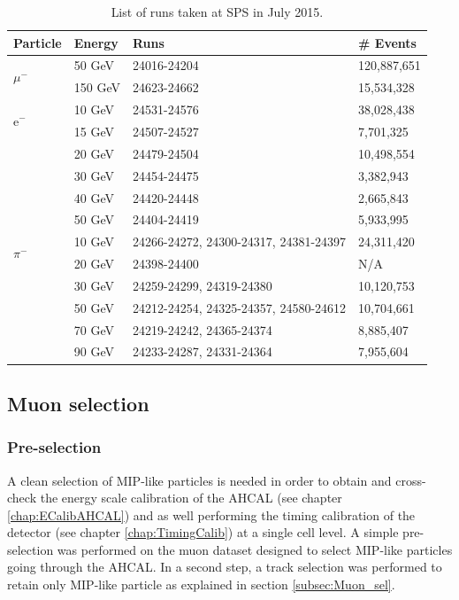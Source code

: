 \begin{table}[htb!]
	\centering
	\caption{List of runs taken at SPS in July 2015.}
	\label{table:dataruns}
	\begin{tabular}{@{}lp{2cm}p{7.5cm}p{2cm}@{}}
		\toprule
		\multicolumn{1}{l}{\textbf{Particle}} & \textbf{Energy} & \textbf{Runs} & \textbf{\# Events}\\
		\midrule
		\multirow{2}{*}{$\mu^-$}& 50 GeV & 24016-24204 & 120,887,651\\& 150 GeV & 24623-24662 & 15,534,328\\
		\midrule
		\multirow{2}{*}{e$^-$}& 10 GeV & 24531-24576 & 38,028,438\\& 15 GeV & 24507-24527 & 7,701,325\\& 20 GeV & 24479-24504 & 10,498,554\\& 30 GeV & 24454-24475 & 3,382,943\\& 40 GeV & 24420-24448 & 2,665,843\\& 50 GeV & 24404-24419 & 5,933,995\\
		\midrule
		\multirow{2}{*}{$\pi^-$}& 10 GeV & 24266-24272, 24300-24317, 24381-24397 & 24,311,420\\& 20 GeV & 24398-24400 & N/A\\& 30 GeV & 24259-24299, 24319-24380 & 10,120,753\\& 50 GeV & 24212-24254, 24325-24357, 24580-24612 & 10,704,661\\& 70 GeV & 24219-24242, 24365-24374 & 8,885,407\\& 90 GeV & 24233-24287, 24331-24364 & 7,955,604\\
		\bottomrule
	\end{tabular}
\end{table}

\subsection{Muon selection}
\label{subsec:Muon_presel}

\subsubsection{Pre-selection}

A clean selection of MIP-like particles is needed in order to obtain and cross-check the energy scale calibration of the AHCAL (see chapter \ref{chap:ECalibAHCAL}) and as well performing the timing calibration of the detector (see chapter \ref{chap:TimingCalib}) at a single cell level. A simple pre-selection was performed on the muon dataset designed to select MIP-like particles going through the AHCAL. In a second step, a track selection was performed to retain only MIP-like particle as explained in section \ref{subsec:Muon_sel}.

